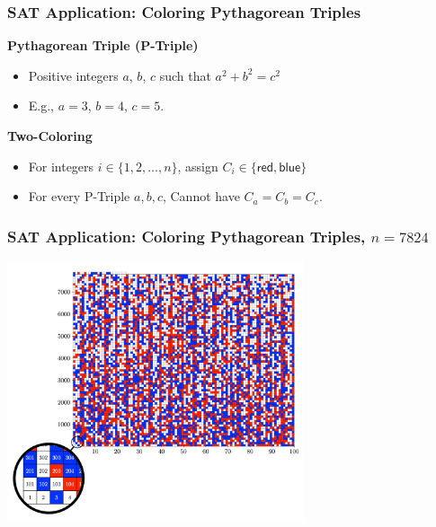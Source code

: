 \documentclass[t,pdf]{beamer}
\begin{document}
\begin{frame}
\frametitle{SAT Application: Coloring Pythagorean Triples}

{\bf Pythagorean Triple (P-Triple)}
\begin{itemize}
\item Positive integers $a$, $b$, $c$ such that $a^2 + b^2 = c^2$
\item E.g., $a=3$, $b=4$, $c=5$.
\end{itemize}

{\bf Two-Coloring}
\begin{itemize}
\item For integers $i \in \{1, 2, \ldots, n\}$, assign $C_i \in \{\textsf{red}, \textsf{blue}\}$
\item For every P-Triple $a, b, c$, Cannot have $C_a = C_b = C_c$.
\end{itemize}


\end{frame}


\begin{frame}
\frametitle{SAT Application: Coloring Pythagorean Triples, $n=7824$}

\begin{center}
  \includegraphics[height=3in]{figs/triple7824}
\end{center}

\end{frame}
\end{document}
